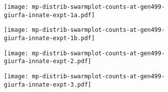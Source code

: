 \documentclass[12pt,twoside]{article}
\begin{document}
\begin{figure}
%
\begin{subfigure}{.5\textwidth}
  \centering
  \texttt{[image: mp-distrib-swarmplot-counts-at-gen499-giurfa-innate-expt-1a.pdf]}
\end{subfigure}%
\begin{subfigure}{.5\textwidth}
  \centering
  \texttt{[image: mp-distrib-swarmplot-counts-at-gen499-giurfa-innate-expt-1b.pdf]}
\end{subfigure}
%
\begin{subfigure}{.5\textwidth}
  \centering
  \texttt{[image: mp-distrib-swarmplot-counts-at-gen499-giurfa-innate-expt-2.pdf]}
\end{subfigure}%
\begin{subfigure}{.5\textwidth}
  \centering
  \texttt{[image: mp-distrib-swarmplot-counts-at-gen499-giurfa-innate-expt-3.pdf]}
\end{subfigure}
%
\end{figure}
\end{document}
